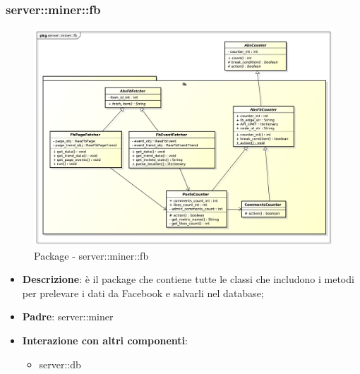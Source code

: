 \subsubsection{server::miner::fb} %
\label{ssub:bdsm_app_server_miner_fb}
\begin{figure}[htbp]
	\centering
	\centerline{\includegraphics[scale=0.3]{./images/server/miner_fb.pdf}}
	\caption{Package - server::miner::fb}
\end{figure}

\begin{itemize}
  \item \textbf{Descrizione}: è il package che contiene tutte le classi che includono i metodi per prelevare i dati da Facebook e salvarli nel database;
  \item \textbf{Padre}: server::miner
  \item \textbf{Interazione con altri componenti}:
  	\begin{itemize}
  		\item server::db
  	\end{itemize}
\end{itemize}

